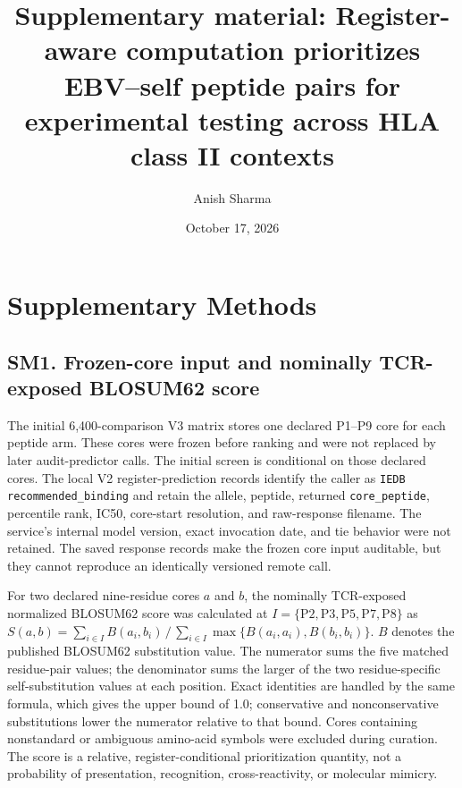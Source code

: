 \documentclass[11pt]{article}
\title{Supplementary material: Register-aware computation prioritizes EBV--self peptide pairs for experimental testing across HLA class II contexts}
\author{Anish Sharma}
\date{October 17, 2026}
\begin{document}
\maketitle

\section{Supplementary Methods}

\subsection{SM1. Frozen-core input and nominally TCR-exposed BLOSUM62 score}
The initial 6,400-comparison V3 matrix stores one declared P1--P9 core for each peptide arm. These cores were frozen before ranking and were not replaced by later audit-predictor calls. The initial screen is conditional on those declared cores. The local V2 register-prediction records identify the caller as \texttt{IEDB recommended\_binding} and retain the allele, peptide, returned \texttt{core\_peptide}, percentile rank, IC50, core-start resolution, and raw-response filename. The service's internal model version, exact invocation date, and tie behavior were not retained. The saved response records make the frozen core input auditable, but they cannot reproduce an identically versioned remote call.

For two declared nine-residue cores $a$ and $b$, the nominally TCR-exposed normalized BLOSUM62 score was calculated at $I=\{\mathrm{P2,P3,P5,P7,P8}\}$ as $S(a,b)=\sum_{i\in I}B(a_i,b_i)\,/\,\sum_{i\in I}\max\{B(a_i,a_i),B(b_i,b_i)\}$. $B$ denotes the published BLOSUM62 substitution value. The numerator sums the five matched residue-pair values; the denominator sums the larger of the two residue-specific self-substitution values at each position. Exact identities are handled by the same formula, which gives the upper bound of 1.0; conservative and nonconservative substitutions lower the numerator relative to that bound. Cores containing nonstandard or ambiguous amino-acid symbols were excluded during curation. The score is a relative, register-conditional prioritization quantity, not a probability of presentation, recognition, cross-reactivity, or molecular mimicry.
\end{document}

